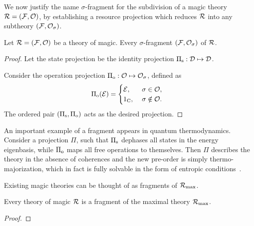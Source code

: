 \documentclass[pra,
aps,
twocolumn,
superscriptaddress,
groupedaddress,
nofootinbib,
reprint
]{revtex4-1}
\begin{document}
We now justify the name $\sigma$-fragment for the subdivision of a magic theory $\mathcal{R} = (\mathcal{F}, \mathcal{O})$, by establishing a resource projection which reduces $\mathcal{R}$ into any subtheory $(\mathcal{F}, \mathcal{O}_\sigma)$.
\begin{proposition}
    Let $\mathcal{R} = (\mathcal{F}, \mathcal{O})$ be a theory of magic.
    Every $\sigma$-fragment $(\mathcal{F}, \mathcal{O}_\sigma)$  of $\mathcal{R}$.
\end{proposition}
\begin{proof}
    Let the state projection be the identity projection $\Pi_{\rm{s}}:\mathcal{D}\mapsto\mathcal{D}$.
    
    Consider the operation projection $\Pi_{\rm{o}}:\mathcal{O} \mapsto \mathcal{O}_\sigma$, defined as
    \begin{equation}
    \Pi_{\rm{o}}(\mathcal{E}) =
    \begin{cases}
        \mathcal{E},\ &\sigma \in \mathcal{O}, \\
        1_{\rm{C}},\ &\sigma \notin \mathcal{O}.
    \end{cases}
    \end{equation}
    The ordered pair $(\Pi_{\rm{s}}, \Pi_{\rm{o}})$ acts as the desired projection.
\end{proof}

An important example of a fragment appears in quantum thermodynamics. 
Consider a projection $\Pi$, such that $\Pi_{\rm{s}}$ dephases all states in the energy eigenbasis, while $\Pi_{\rm{o}}$ maps all free operations to themselves.
Then $\Pi$ describes the theory in the absence of coherences and the new pre-order is simply thermo-majorization, which in fact is fully solvable in the form of entropic conditions~\cite{cit:gour}. 

Existing magic theories can be thought of as fragments of $\mathcal{R}_{\rm{}max}$.
\begin{proposition}
    Every theory of magic $\mathcal{R}$ is a fragment of the maximal theory $\mathcal{R}_{\rm{}max}$.
\end{proposition}
\begin{proof}
\end{proof}

\end{document}
